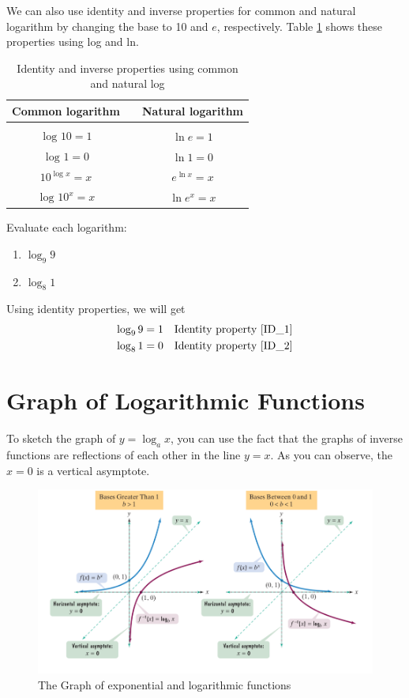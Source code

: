 %
We can also use identity and inverse properties for common and natural logarithm by changing the base to 10 and $e$, respectively. Table \ref{tab:intro_log_ln} shows these properties using log and ln.
	\begin{table}[H]
	\centering
	\caption{Identity and inverse properties using common and natural log}
	\begin{tabular}{c c c}
	    \toprule
		Common logarithm & & Natural logarithm\\
		\hline \hline \\
		$\log_{}10=1$	&	& $\ln{}e=1$	\\[.4cm]
		$\log_{}1=0$	&	& $\ln{1}=0$ \\[.4cm]	
		$\displaystyle 10^{\log_{}x} = x$ & & $\displaystyle e^{\ln{x}} = x$ \\[.4cm]
		$\displaystyle \log_{}10^{x} = x$ & & $\displaystyle \ln{e^x} = x$ \\[.4cm]
		\bottomrule
	\end{tabular}
	\label{tab:intro_log_ln}
	\end{table}
\begin{exa}
    Evaluate each logarithm:
    \begin{multicols}{2}
    \begin{enumerate}[\bfseries a.]
        \item $\log_{9}9$
        \item $\log_{8}1$
    \end{enumerate}
    \end{multicols}
\end{exa}
Using identity properties, we will get
	\begin{align*}
		\log_{9}9=1 & &\text{Identity property \eqref{ID_1}}\\
		\log_{8}1=0 & &\text{Identity property \eqref{ID_2}}
	\end{align*}

\section{Graph of Logarithmic Functions}
To sketch the graph of $y=\log_{a}x$, you can use the fact that the graphs of inverse
functions are reflections of each other in the line $y=x$. As you can observe, the $x=0$ 
is a vertical asymptote.
		\begin{figure}[H]
		 \includegraphics[width=12cm]{pics/log_vs_exp.png}
		 \centering
		 \caption{The Graph of exponential and logarithmic functions}
		 \label{fig:log_vs_exp}
		\end{figure}

